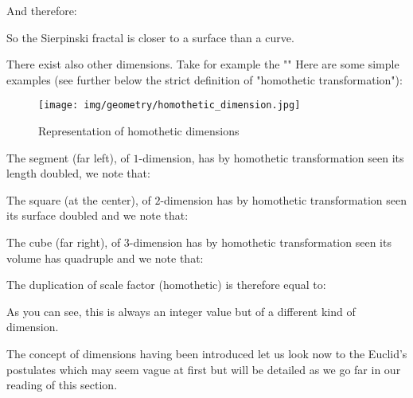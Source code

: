 	And therefore:
	
	So the Sierpinski fractal is closer to a surface than a curve.
	
	There exist also other dimensions. Take for example the "" Here are some simple examples (see further below the strict definition of "homothetic transformation"):
	\begin{figure}[H]
		\centering
		\texttt{[image: img/geometry/homothetic\_dimension.jpg]}
		\caption{Representation of homothetic dimensions}
	\end{figure}
	The segment (far left), of $1$-dimension, has by homothetic transformation seen its length doubled, we note that:
	
	The square (at the center), of $2$-dimension has by homothetic transformation seen its surface doubled and we note that:
	
	The cube (far right), of 3-dimension has by homothetic transformation seen its volume has quadruple and we note that:
	
	The duplication of scale factor (homothetic) is therefore equal to:
	
	As you can see, this is always an integer value but of a different kind of dimension.
	
	The concept of dimensions having been introduced let us look now to the Euclid's postulates which may seem vague at first but will be detailed as we go far in our reading of this section.
	
	\pagebreak
